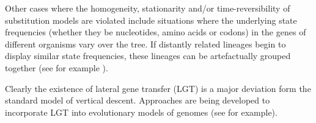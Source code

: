Other cases where the homogeneity, stationarity and/or time-reversibility of substitution models are violated include situations where the underlying state frequencies (whether they be nucleotides, amino acids or codons) in the genes of different organisms vary over the tree. If distantly related lineages begin to display similar state frequencies, these lineages can be artefactually grouped together (see for example \cite{foster2004modeling,jermiin2004biasing}).

Clearly the existence of lateral gene transfer (LGT) is a major deviation form the standard model of vertical descent. Approaches are being developed to incorporate LGT into evolutionary models of genomes (see \cite{zhaxybayeva2004genome} for example).

